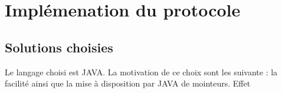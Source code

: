 \chapter{Implémenation du protocole}

\section{Solutions choisies}
Le langage choisi est \textsc{JAVA}. La motivation de ce choix sont les suivante : la facilité  ainsi que la mise à disposition par \textsc{JAVA} de mointeurs. Effet
